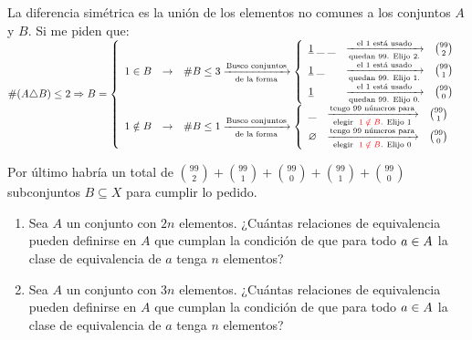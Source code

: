 \documentclass[12pt,a4paper, spanish]{article}
\begin{document}
La diferencia simétrica es la unión de los elementos no comunes a los conjuntos $A$ y $B$. Si me piden que:\\
$\#( A \triangle B) \leq 2 \entonces B =
	\llave{ccl}{
		1 \en B & \to & \#B \leq 3
		\flecha{Busco conjuntos}[de la forma]
		\llave{lll}{
			\underline{1}\; \_ \;\_ &\flecha{el 1 está usado}[quedan  99. Elijo 2.] &   \binom{99}{2}\\
			\underline{1} \;\_      &\flecha{el 1 está usado}[quedan  99. Elijo 1.] &   \binom{99}{1}\\
			\underline{1}           &\flecha{el 1 está usado}[quedan  99. Elijo 0.] &  \binom{99}{0}
		}\\
		1 \notin B & \to & \#B \leq 1
		\flecha{Busco conjuntos}[de la forma]
		\llave{lll}{
			\_ & \flecha{tengo 99 números para}[elegir \red{$1 \notin B$}. Elijo 1]     & \binom{99}{1}\\
			\vacio & \flecha{tengo 99 números para}[elegir \red{$1 \notin B$}. Elijo 0] & \binom{99}{0}
		}\\
	}$

Por último habría un total de $ \binom{99}{2} + \binom{99}{1} + \binom{99}{0} +\binom{99}{1} + \binom{99}{0}$ subconjuntos $B \subseteq X$
para cumplir lo pedido.


\ejercicio

\begin{enumerate}[label=\roman*)]
	\item Sea $A$ un conjunto con $2n$ elementos. ¿Cuántas relaciones de equivalencia pueden definirse en $A$ que cumplan la condición
	      de que para todo $a \in A$ la clase de equivalencia de $a$ tenga $n$ elementos?

	\item Sea $A$ un conjunto con $3n$ elementos. ¿Cuántas relaciones de equivalencia pueden definirse en $A$ que cumplan la condición
	      de que para todo $a \in A$ la clase de equivalencia de $a$ tenga $n$ elementos?

\end{enumerate}
\end{document}
